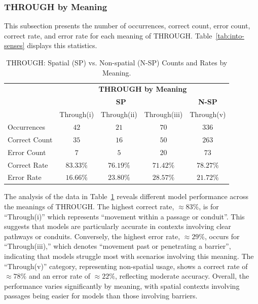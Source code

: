 \subsubsection{THROUGH by Meaning}

This subsection presents the number of occurrences, correct count, error count, correct rate, and error rate for each meaning of THROUGH. Table~\ref{tab:into-senses} displays this statistics. 

\begin{table}[htb]
\centering
\begin{tabular}{lcccc}
\toprule
 & \multicolumn{4}{c}{\textbf{THROUGH by Meaning}} \\ 
 & \multicolumn{3}{c}{\textbf{SP}} & \textbf{N-SP} \\ 
 & Through(i) & Through(ii) & Through(iii) & Through(v) \\
\midrule
Occurrences & $42$ & $21$ & $70$ & $336$ \\ 
Correct Count & $35$ & $16$ & $50$ & $263$ \\  
Error Count & $7$ & $5$ & $20$ & $73$ \\ 
\midrule
Correct Rate & $\mathbf{83.33\%}$ & $76.19\%$ & $71.42\%$ & $78.27\%$ \\ 
\midrule
Error Rate & $16.66\%$ & $23.80\%$ & $\mathbf{28.57\%}$ & $21.72\%$ \\ 
\bottomrule
\end{tabular}
\caption{THROUGH: Spatial (SP) vs. Non-spatial (N-SP) Counts and Rates by Meaning.}
\label{tab:through-senses}
\end{table}

The analysis of the data in Table~\ref{tab:through-senses} reveals different model performance across the meanings of THROUGH. The highest correct rate, $\approx83\%$, is for ``Through(i)'' which represents ``movement within a passage or conduit''. This suggests that models are particularly accurate in contexts involving clear pathways or conduits. Conversely, the highest error rate, $\approx29\%$, occurs for ``Through(iii),'' which denotes ``movement past or penetrating a barrier'', indicating that models struggle most with scenarios involving this meaning. The ``Through(v)'' category, representing non-spatial usage, shows a correct rate of $\approx78\%$ and an error rate of $\approx22\%$, reflecting moderate accuracy. Overall, the performance varies significantly by meaning, with spatial contexts involving passages being easier for models than those involving barriers.


